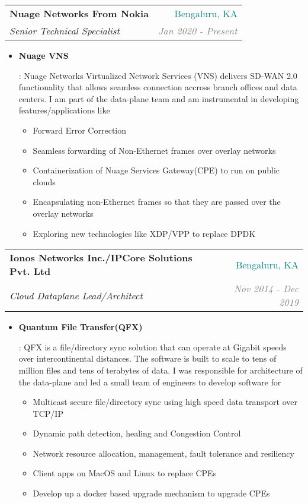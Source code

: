 \documentclass[letterpaper,11pt]{article}
\makeatletter
\newcommand{\resumeItem}[2]{
  \item\small{
    \textbf{#1}{: #2 \vspace{-2pt}}
  }
}
\newcommand{\resumeSubheading}[4]{
  \vspace{-1pt}\item
    \begin{tabular*}{0.97\textwidth}[t]{l@{\extracolsep{\fill}}r}
      \textbf{#1} & #2 \\
      \textit{\small#3} & \textit{\small #4} \\
    \end{tabular*}\vspace{-5pt}
}
\newcommand{\resumeItemListStart}{\begin{itemize}}
\newcommand{\resumeItemListEnd}{\end{itemize}\vspace{-5pt}}
\makeatother
\begin{document}
       \resumeSubheading
      {Nuage Networks From Nokia}{\textcolor{teal}{Bengaluru, KA}}
      {Senior Technical Specialist}{\textcolor{GRAY}{Jan 2020 - Present}}
      \resumeItemListStart
        \resumeItem{Nuage VNS}
          {
           Nuage Networks Virtualized Network Services (VNS) delivers SD-WAN 2.0 functionality that allows seamless connection accross branch offices and data centers. I am part of the data-plane team and am instrumental in developing features/applications like
           \begin{itemize}
           \item {Forward Error Correction}
           \item {Seamless forwarding of Non-Ethernet frames over overlay networks}
           \item {Containerization of Nuage Services Gateway(CPE) to run on public clouds}
           \item {Encapsulating non-Ethernet frames so that they are passed over the overlay networks}
           \item {Exploring new technologies like XDP/VPP to replace DPDK}
           \end{itemize}}
      \resumeItemListEnd
    \resumeSubheading
      {Ionos Networks Inc./IPCore Solutions Pvt. Ltd}{\textcolor{teal}{Bengaluru, KA}}
      {Cloud Dataplane Lead/Architect}{\textcolor{GRAY}{Nov 2014 - Dec 2019}}
      \resumeItemListStart
        \resumeItem{Quantum File Transfer(QFX)}
          {
           QFX is a file/directory sync solution that can operate at Gigabit speeds over intercontinental distances. The software is built to scale to tens of  million files and tens of  terabytes of data. I was responsible for architecture of the data-plane and led a small team of engineers to develop software for
           
           \begin{itemize}
           \item {Multicast secure file/directory sync using high speed data transport over TCP/IP}
           \item {Dynamic path detection, healing and Congestion Control}
           \item {Network resource allocation, management, fault tolerance and resiliency}
           \item {Client apps on MacOS and Linux to replace CPEs}
           \item {Develop up a docker based upgrade mechanism to upgrade CPEs}
           \end{itemize}}
      \resumeItemListEnd
\end{document}
